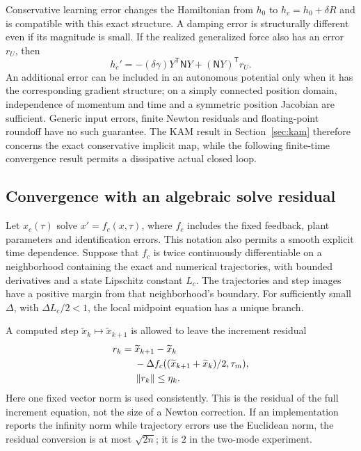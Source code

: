 Conservative learning error changes the Hamiltonian from $h_0$ to $h_c=h_0+\delta R$ and is compatible with this exact structure. A damping error is structurally different even if its magnitude is small. If the realized generalized force also has an error $r_U$, then
\begin{equation}\label{ctrl:power}
 h_c'=-(\delta\gamma)Y^{\mathsf T}\mathsf N Y
                         +(\mathsf N Y)^{\mathsf T}r_U.
\end{equation}
An additional error can be included in an autonomous potential only when it has the corresponding gradient structure; on a simply connected position domain, independence of momentum and time and a symmetric position Jacobian are sufficient. Generic input errors, finite Newton residuals and floating-point roundoff have no such guarantee. The KAM result in Section~\ref{sec:kam} therefore concerns the exact conservative implicit map, while the following finite-time convergence result permits a dissipative actual closed loop.

\subsection{Convergence with an algebraic solve residual}
\label{ctrl:convergence-section}

Let $x_c(\tau)$ solve $x'=f_c(x,\tau)$, where $f_c$ includes the fixed feedback, plant parameters and identification errors. This notation also permits a smooth explicit time dependence. Suppose that $f_c$ is twice continuously differentiable on a neighborhood containing the exact and numerical trajectories, with bounded derivatives and a state Lipschitz constant $L_c$. The trajectories and step images have a positive margin from that neighborhood's boundary. For sufficiently small $\Delta$, with $\Delta L_c/2<1$, the local midpoint equation has a unique branch.

A computed step $\widetilde x_k\mapsto\widetilde x_{k+1}$ is allowed to leave the increment residual
\begin{equation}\label{ctrl:solve-residual}
\begin{aligned}
 r_k={}&\widetilde x_{k+1}-\widetilde x_k\\
       &-\Delta f_c((\widetilde x_{k+1}+\widetilde x_k)/2,\tau_m),\\
 &\left\lVert r_k\right\rVert\le\eta_k.
\end{aligned}
\end{equation}
Here one fixed vector norm is used consistently. This is the residual of the full increment equation, not the size of a Newton correction. If an implementation reports the infinity norm while trajectory errors use the Euclidean norm, the residual conversion is at most $\sqrt{2n}$; it is $2$ in the two-mode experiment.

